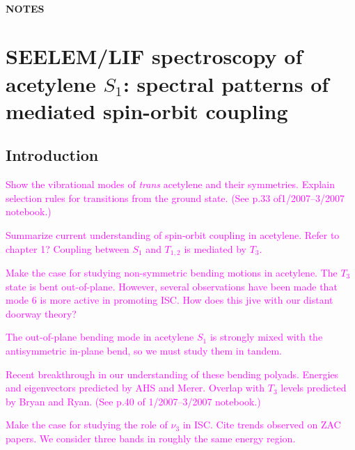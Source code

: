 \documentclass[12pt]{mitthesis}
\newcommand{\POINT}[1]{\textcolor{magenta}{#1}}
\begin{document}
\tableofcontents
\clearpage

\subsubsection*{NOTES}

\clearpage

\chapter{SEELEM/LIF spectroscopy of 
  acetylene $S_1$: 
spectral patterns of mediated spin-orbit coupling
}

\section{Introduction}

\POINT{Show the vibrational modes of \emph{trans} acetylene and their
  symmetries.  Explain selection rules for transitions from the ground
  state.  (See p.33 of1/2007--3/2007 notebook.)}

\POINT{Summarize current understanding of spin-orbit coupling in
  acetylene.  Refer to chapter 1?  Coupling between $S_1$ and
  $T_{1,2}$ is mediated by $T_3$.}

\POINT{Make the case for studying non-symmetric bending motions in
  acetylene.  The $T_3$ state is bent out-of-plane.  However, several
  observations have been made that mode 6 is more active in promoting
  ISC.  How does this jive with our distant doorway theory?}

\POINT{The out-of-plane bending mode in acetylene $S_1$ is strongly
  mixed with the antisymmetric in-plane bend, so we must study them in
  tandem.}

\POINT{Recent breakthrough in our understanding of these bending
  polyads.  Energies and eigenvectors predicted by AHS and Merer.
  Overlap with $T_3$ levels predicted by Bryan and Ryan.  (See p.40 of
  1/2007--3/2007 notebook.)}

\POINT{Make the case for studying the role of $\nu_3$ in ISC.  Cite
  trends observed on ZAC papers.  We consider three bands in roughly
  the same energy region.}
\end{document}
